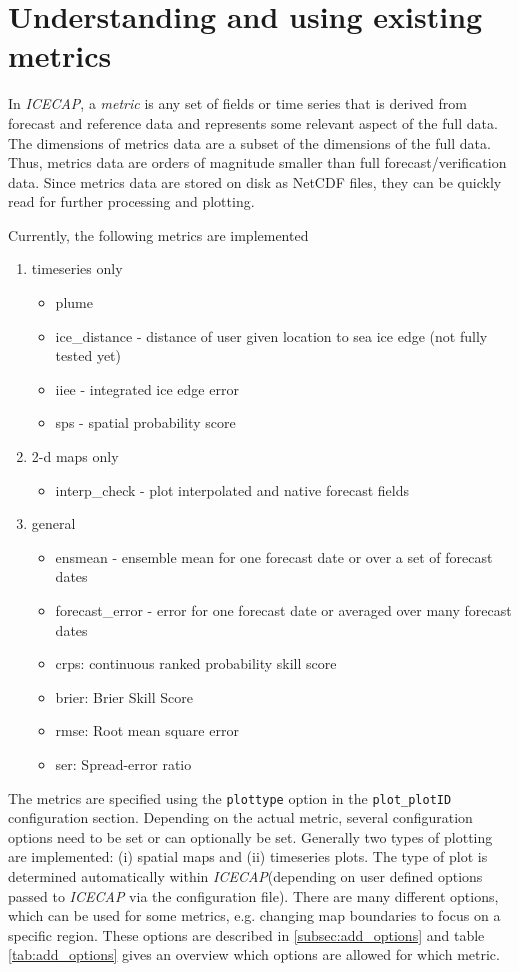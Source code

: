 \documentclass[DIV=10, parskip=full]{scrreprt}
\newcommand{\ice}{\textit{ICECAP}\xspace}
\newcommand{\notimplement}[1]{#1}
\begin{document}
\section{Understanding and using existing metrics}
In \ice, a \emph{metric} is any set of fields or time series that is derived from forecast and reference data and represents some relevant aspect of the full data. The dimensions of metrics data are a subset of the dimensions of the full data. Thus, metrics data are orders of magnitude smaller than full forecast/verification data. Since metrics data are stored on disk as NetCDF files, they can be quickly read for further processing and plotting. 

Currently, the following metrics are \notimplement{implemented}
\begin{enumerate}
	\item timeseries only
	\begin{itemize}
		\item plume
		\item ice\_distance - distance of user given location to sea ice edge (not fully tested yet)
		\item iiee - integrated ice edge error
		\item sps - spatial probability score
	\end{itemize}
	\item 2-d maps only
	\begin{itemize}
		\item interp\_check - plot interpolated and native forecast fields
	\end{itemize}
	\item general
		\begin{itemize}
		\item ensmean - ensemble mean for one forecast date or over a set of forecast dates 
		\item forecast\_error - error for one forecast date or averaged over many forecast dates
		\item crps: continuous ranked probability skill score
		\item brier: Brier Skill Score
		\item rmse: Root mean square error
		\item ser: Spread-error ratio
	\end{itemize}
\end{enumerate}

The metrics are specified using the \texttt{plottype} option in the \texttt{plot\_plotID} configuration section. Depending on the actual metric, several configuration options need to be set or can optionally be set. Generally two types of plotting are implemented: (i) spatial maps and (ii) timeseries plots. The type of plot is determined automatically within \ice (depending on user defined options passed to \ice via the configuration file). There are many different options, which can be used for some metrics, e.g. changing map boundaries to focus on a specific region. These options are described in \ref{subsec:add_options} and table \ref{tab:add_options} gives an overview which options are allowed for which metric.
\end{document}
